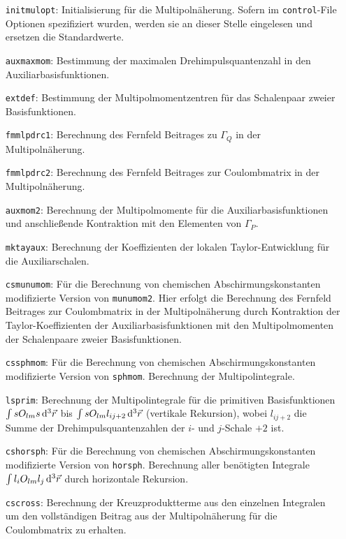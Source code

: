 	\begin{itemize}[leftmargin=70pt]
	\item[\texttt{initmulopt}:] Initialisierung für die Multipolnäherung. Sofern im \texttt{control}-File Optionen spezifiziert wurden, werden sie an dieser Stelle eingelesen und ersetzen die Standardwerte.
	\item[\texttt{auxmaxmom}:] Bestimmung der maximalen Drehimpulsquantenzahl in den Auxiliarbasisfunktionen.
	\item[\texttt{extdef}:] Bestimmung der Multipolmomentzentren für das Schalenpaar zweier Basisfunktionen.
	\item[\texttt{fmmlpdrc1}:] Berechnung des Fernfeld Beitrages zu $\Gamma_Q$ in der Multipolnäherung.
	\item[\texttt{fmmlpdrc2}:] Berechnung des Fernfeld Beitrages zur Coulombmatrix in der Multipolnäherung.
	\item[\texttt{auxmom2}:] Berechnung der Multipolmomente für die Auxiliarbasisfunktionen und anschließende Kontraktion mit den Elementen von $\Gamma_P$.
	\item[\texttt{mktayaux}:] Berechnung der Koeffizienten der lokalen Taylor-Entwicklung für die Auxiliarschalen.
	\item[\texttt{csmunumom}:] Für die Berechnung von chemischen Abschirmungskonstanten modifizierte Version von \texttt{munumom2}. Hier erfolgt die Berechnung des Fernfeld Beitrages zur Coulombmatrix in der Multipolnäherung durch Kontraktion der Taylor-Koeffizienten der Auxiliarbasisfunktionen mit den Multipolmomenten der Schalenpaare zweier Basisfunktionen.
	\item[\texttt{cssphmom}:] Für die Berechnung von chemischen Abschirmungskonstanten modifizierte Version von \texttt{sphmom}. Berechnung der Multipolintegrale.
	\item[\texttt{lsprim}:] Berechnung der Multipolintegrale für die primitiven Basisfunktionen $\int s O_{lm} s\mathop{}\!\mathrm{d^3}\vec{r}$ bis $\int s O_{lm} l_{ij+2} \mathop{}\!\mathrm{d^3}\vec{r}$ (vertikale Rekursion), wobei $l_{ij+2}$ die Summe der Drehimpulsquantenzahlen der $i$- und $j$-Schale $+2$ ist.
	\item[\texttt{cshorsph}:] Für die Berechnung von chemischen Abschirmungskonstanten modifizierte Version von \texttt{horsph}. Berechnung aller benötigten Integrale  $\int l_i O_{lm} l_j\mathop{}\!\mathrm{d^3}\vec{r}$ durch horizontale Rekursion.
	\item[\texttt{cscross}:] Berechnung der Kreuzproduktterme aus den einzelnen Integralen um den vollständigen Beitrag aus der Multipolnäherung für die Coulombmatrix zu erhalten.
	\end{itemize}
	
